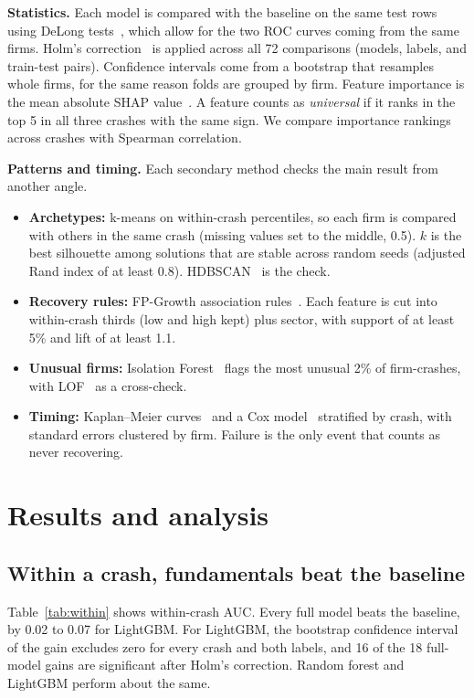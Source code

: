 \documentclass[11pt]{article}
\begin{document}
\textbf{Statistics.} Each model is compared with the baseline on the same test rows using DeLong tests~\cite{delong1988,sun2014}, which allow for the two ROC curves coming from the same firms. Holm's correction~\cite{holm1979} is applied across all 72 comparisons (models, labels, and train-test pairs). Confidence intervals come from a bootstrap that resamples whole firms, for the same reason folds are grouped by firm. Feature importance is the mean absolute SHAP value~\cite{lundberg2017}. A feature counts as \emph{universal} if it ranks in the top 5 in all three crashes with the same sign. We compare importance rankings across crashes with Spearman correlation.

\textbf{Patterns and timing.} Each secondary method checks the main result from another angle.
\begin{itemize}
  \item \textbf{Archetypes:} k-means on within-crash percentiles, so each firm is compared with others in the same crash (missing values set to the middle, 0.5). $k$ is the best silhouette among solutions that are stable across random seeds (adjusted Rand index of at least 0.8). HDBSCAN~\cite{campello2013} is the check.
  \item \textbf{Recovery rules:} FP-Growth association rules~\cite{han2000}. Each feature is cut into within-crash thirds (low and high kept) plus sector, with support of at least 5\% and lift of at least 1.1.
  \item \textbf{Unusual firms:} Isolation Forest~\cite{liu2008} flags the most unusual 2\% of firm-crashes, with LOF~\cite{breunig2000} as a cross-check.
  \item \textbf{Timing:} Kaplan--Meier curves~\cite{kaplan1958} and a Cox model~\cite{cox1972} stratified by crash, with standard errors clustered by firm. Failure is the only event that counts as never recovering.
\end{itemize}

\section{Results and analysis}

\subsection{Within a crash, fundamentals beat the baseline}
Table~\ref{tab:within} shows within-crash AUC. Every full model beats the baseline, by 0.02 to 0.07 for LightGBM. For LightGBM, the bootstrap confidence interval of the gain excludes zero for every crash and both labels, and 16 of the 18 full-model gains are significant after Holm's correction. Random forest and LightGBM perform about the same.
\end{document}
